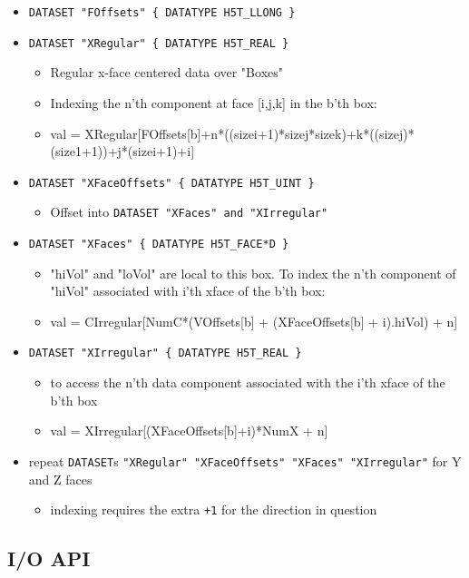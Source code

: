\begin{itemize}
\item  {\tt DATASET "FOffsets" \{ DATATYPE  H5T\_LLONG \} }
\item  {\tt DATASET "XRegular" \{ DATATYPE  H5T\_REAL \} } 
    \begin{itemize} 
        \item Regular x-face centered data over  "Boxes"
        \item Indexing the n'th component at face [i,j,k] in the b'th box:
        \item val = XRegular[FOffsets[b]+n*((sizei+1)*sizej*sizek)+k*((sizej)*
                    (size1+1))+j*(sizei+1)+i]
    \end{itemize}

\item  {\tt DATASET  "XFaceOffsets" \{ DATATYPE  H5T\_UINT \}}
   \begin{itemize} \item  Offset into  {\tt DATASET  "XFaces"  and "XIrregular" }
   \end{itemize}

\item    {\tt DATASET  "XFaces" \{ DATATYPE  H5T\_FACE*D \} }
    \begin{itemize} \item "hiVol" and "loVol" are local to this box. To index 
                           the n'th component of "hiVol"
                           associated with i'th xface of the b'th box:
                    \item val =  CIrregular[NumC*(VOffsets[b] 
                    + (XFaceOffsets[b] + i).hiVol) + n]
     \end{itemize}
\item {\tt DATASET  "XIrregular" \{ DATATYPE  H5T\_REAL \} }
    \begin{itemize}
                 \item to access the n'th data component associated with the i'th
                        xface of the b'th box
                 \item val = XIrregular[(XFaceOffsets[b]+i)*NumX + n]
 
   \end{itemize}   

\item repeat {\tt DATASET}s {\tt "XRegular" "XFaceOffsets" "XFaces" "XIrregular"} for Y and Z faces
   \begin{itemize}
                 \item indexing requires the extra {\tt +1} for the direction in question
   \end{itemize}

\end{itemize}

\subsection{I/O API}


